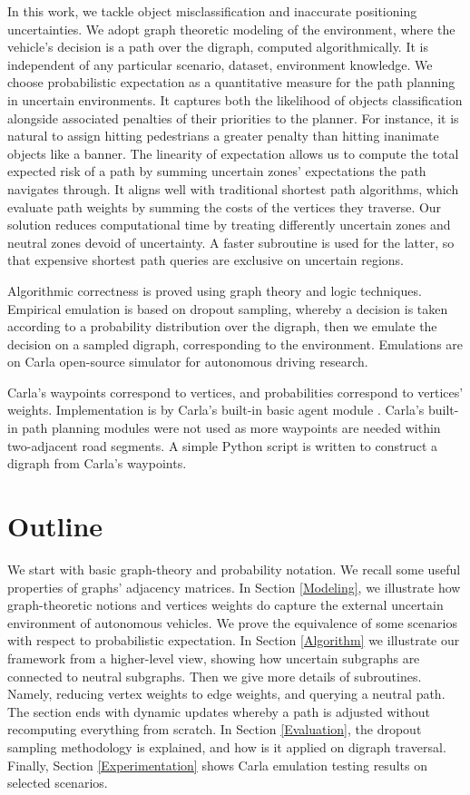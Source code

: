 \documentclass[pdflatex,sn-mathphys-num]{sn-jnl}%
\begin{document}
In this work, we tackle object misclassification and inaccurate positioning uncertainties. We adopt graph theoretic modeling of the environment, where the vehicle's decision is a path over the digraph, computed algorithmically. It is independent of any particular scenario, dataset, environment knowledge. We choose probabilistic expectation as a quantitative measure for the path planning in uncertain environments. It captures both the likelihood of objects classification alongside associated penalties of their priorities to the planner. For instance, it is natural to assign hitting pedestrians a greater penalty than hitting inanimate objects like a banner. The linearity of expectation allows us to compute the total expected risk of a path by summing uncertain zones' expectations the path navigates through. It aligns well with traditional shortest path algorithms, which evaluate path weights by summing the costs of the vertices they traverse. Our solution reduces computational time by treating differently uncertain zones and neutral zones devoid of uncertainty. A faster subroutine is used for the latter, so that expensive shortest path queries are exclusive on uncertain regions.

Algorithmic correctness is proved using graph theory and logic techniques. Empirical emulation is based on dropout sampling, whereby a decision is taken according to a probability distribution over the digraph, then we emulate the decision on a sampled digraph, corresponding to the environment. Emulations are on Carla open-source simulator for autonomous driving research.

Carla's waypoints correspond to vertices, and probabilities correspond to vertices' weights. Implementation is by Carla's built-in basic agent module \cite{py-carla}. Carla's built-in path planning modules were not used as more waypoints are needed within two-adjacent road segments. A simple Python script is written to construct a digraph from Carla's waypoints.


\section{Outline}

We start with basic graph-theory and probability notation. We recall some useful properties of graphs' adjacency matrices. In Section \ref{Modeling}, we illustrate how graph-theoretic notions and vertices weights do capture the external uncertain environment of autonomous vehicles. We prove the equivalence of some scenarios with respect to probabilistic expectation. In Section \ref{Algorithm} we illustrate our framework from a higher-level view, showing how uncertain subgraphs are connected to neutral subgraphs. Then we give more details of subroutines. Namely, reducing vertex weights to edge weights, and querying a neutral path. The section ends with dynamic updates whereby a path is adjusted without recomputing everything from scratch. In Section \ref{Evaluation}, the dropout sampling methodology is explained, and how is it applied on digraph traversal. Finally, Section \ref{Experimentation} shows Carla emulation testing results on selected scenarios.
\end{document}
